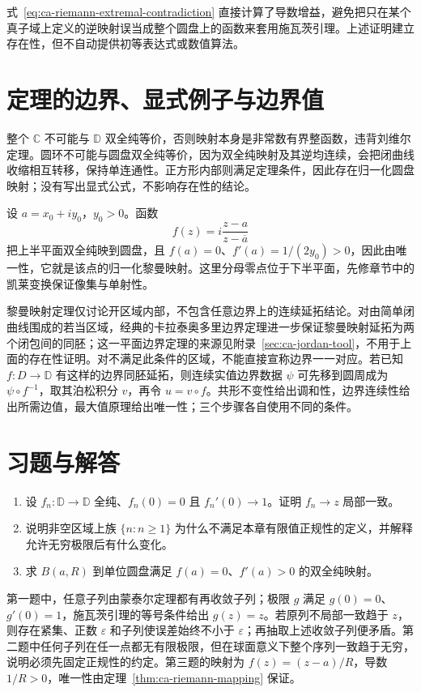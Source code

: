 式~\eqref{eq:ca-riemann-extremal-contradiction} 直接计算了导数增益，避免把只在某个真子域上定义的逆映射误当成整个圆盘上的函数来套用施瓦茨引理。上述证明建立存在性，但不自动提供初等表达式或数值算法。

\section{定理的边界、显式例子与边界值}

\begin{example}[三个假设各有作用]
整个 $\mathbb C$ 不可能与 $\mathbb D$ 双全纯等价，否则映射本身是非常数有界整函数，违背刘维尔定理。圆环不可能与圆盘双全纯等价，因为双全纯映射及其逆均连续，会把闭曲线收缩相互转移，保持单连通性。正方形内部则满足定理条件，因此存在归一化圆盘映射；没有写出显式公式，不影响存在性的结论。
\end{example}

\begin{example}[上半平面的归一化映射]
设 $a=x_0+iy_0$，$y_0>0$。函数
\[
 f(z)=i\frac{z-a}{z-\overline a}
\]
把上半平面双全纯映到圆盘，且 $f(a)=0$、$f'(a)=1/(2y_0)>0$，因此由唯一性，它就是该点的归一化黎曼映射。这里分母零点位于下半平面，先修章节中的凯莱变换保证像集与单射性。
\end{example}

黎曼映射定理仅讨论开区域内部，不包含任意边界上的连续延拓结论。对由简单闭曲线围成的若当区域，经典的卡拉泰奥多里边界定理进一步保证黎曼映射延拓为两个闭包间的同胚；这一平面边界定理的来源见附录~\ref{sec:ca-jordan-tool}，不用于上面的存在性证明。对不满足此条件的区域，不能直接宣称边界一一对应。若已知 $f:D\to\mathbb D$ 有这样的边界同胚延拓，则连续实值边界数据 $\psi$ 可先移到圆周成为 $\psi\circ f^{-1}$，取其泊松积分 $v$，再令 $u=v\circ f$。共形不变性给出调和性，边界连续性给出所需边值，最大值原理给出唯一性；三个步骤各自使用不同的条件。

\section{习题与解答}

\begin{enumerate}
 \item 设 $f_n:\mathbb D\to\mathbb D$ 全纯、$f_n(0)=0$ 且 $f_n'(0)\to1$。证明 $f_n\to z$ 局部一致。
 \item 说明非空区域上族 $\{n:n\ge1\}$ 为什么不满足本章有限值正规性的定义，并解释允许无穷极限后有什么变化。
 \item 求 $B(a,R)$ 到单位圆盘满足 $f(a)=0$、$f'(a)>0$ 的双全纯映射。
\end{enumerate}
\begin{solve}[解答]
第一题中，任意子列由蒙泰尔定理都有再收敛子列；极限 $g$ 满足 $g(0)=0$、$g'(0)=1$，施瓦茨引理的等号条件给出 $g(z)=z$。若原列不局部一致趋于 $z$，则存在紧集、正数 $\varepsilon$ 和子列使误差始终不小于 $\varepsilon$；再抽取上述收敛子列便矛盾。第二题中任何子列在任一点都无有限极限，但在球面意义下整个序列一致趋于无穷，说明必须先固定正规性的约定。第三题的映射为 $f(z)=(z-a)/R$，导数 $1/R>0$，唯一性由定理~\ref{thm:ca-riemann-mapping} 保证。
\end{solve}

